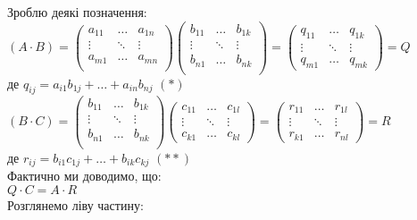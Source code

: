 \documentclass[a4paper, 10pt]{article}
\theoremstyle{theoremdd}
\begin{document}
	Зроблю деякі позначення: \\ $(A \cdot B) = \begin{pmatrix}
	a_{11} & \dots & a_{1n} \\
	\vdots & \ddots & \vdots \\
	a_{m1} & \dots & a_{mn} \\
	\end{pmatrix} \begin{pmatrix}
	b_{11} & \dots & b_{1k} \\
	\vdots & \ddots & \vdots \\
	b_{n1} & \dots & b_{nk} \\
	\end{pmatrix} = \begin{pmatrix}
	q_{11} & \dots & q_{1k} \\
	\vdots & \ddots & \vdots \\
	q_{m1} & \dots & q_{mk}
	\end{pmatrix} = Q$\\
	де $q_{ij} = a_{i1}b_{1j} + \dots + a_{in}b_{nj}$ $(*)$\\
	$(B \cdot C) = \begin{pmatrix}
	b_{11} & \dots & b_{1k} \\
	\vdots & \ddots & \vdots \\
	b_{n1} & \dots & b_{nk} \\
	\end{pmatrix} \begin{pmatrix}
	c_{11} & \dots & c_{1l} \\
	\vdots & \ddots & \vdots \\
	c_{k1} & \dots & c_{kl}
	\end{pmatrix} = \begin{pmatrix}
	r_{11} & \dots & r_{1l} \\
	\vdots & \ddots & \vdots \\
	r_{k1} & \dots & r_{nl}
	\end{pmatrix} = R$ \\
	де $r_{ij} = b_{i1}c_{1j} + \dots + b_{ik}c_{kj}$ $(**)$\\
	Фактично ми доводимо, що:\\
	$Q \cdot C = A \cdot R$\\
	Розглянемо ліву частину:\\
\end{document}
